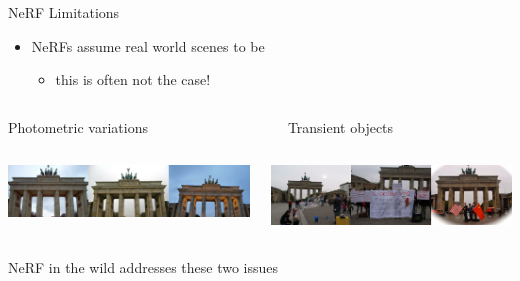 \documentclass[aspectratio=1610]{beamer}
\renewcommand{\bold}[1]{\textbf{\structure{#1}}}
\begin{document}
\begin{frame}{NeRF Limitations}
    \begin{itemize}
        \item NeRFs assume real world scenes to be \bold{static}
        \pause
        \begin{itemize}
            \item this is often not the case!
        \end{itemize}
    \end{itemize}
    \vspace{1.2cm}
    \begin{columns}[t]
        \begin{column}{.4\textwidth}
            Photometric variations\\
        \end{column}
        \begin{column}{.4\textwidth}
            Transient objects\\
        \end{column}
    \end{columns}
    \begin{columns}
        \begin{column}{.4\textwidth}
            \begin{center}
                \includegraphics[width=\textwidth]{issues-var.png}
            \end{center}
        \end{column}
        \begin{column}{.4\textwidth}
            \begin{center}
                \includegraphics[width=\textwidth]{issues-transient.png}
            \end{center}
        \end{column}
    \end{columns}
    \vspace{1.2cm}
    \pause
    NeRF in the wild addresses these two issues
\end{frame}
\end{document}
